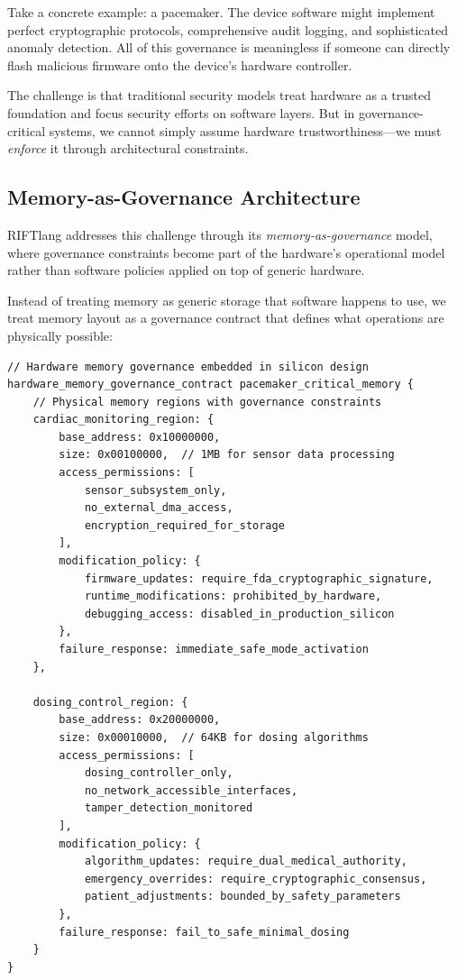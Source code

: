 Take a concrete example: a pacemaker. The device software might implement perfect cryptographic protocols, comprehensive audit logging, and sophisticated anomaly detection. All of this governance is meaningless if someone can directly flash malicious firmware onto the device's hardware controller.

The challenge is that traditional security models treat hardware as a trusted foundation and focus security efforts on software layers. But in governance-critical systems, we cannot simply assume hardware trustworthiness—we must \textit{enforce} it through architectural constraints.

\subsection{Memory-as-Governance Architecture}

RIFTlang addresses this challenge through its \textit{memory-as-governance} model, where governance constraints become part of the hardware's operational model rather than software policies applied on top of generic hardware.

Instead of treating memory as generic storage that software happens to use, we treat memory layout as a governance contract that defines what operations are physically possible:

\begin{lstlisting}[language=rift, caption=Hardware-Level Memory Governance]
// Hardware memory governance embedded in silicon design
hardware_memory_governance_contract pacemaker_critical_memory {
    // Physical memory regions with governance constraints
    cardiac_monitoring_region: {
        base_address: 0x10000000,
        size: 0x00100000,  // 1MB for sensor data processing
        access_permissions: [
            sensor_subsystem_only,
            no_external_dma_access,
            encryption_required_for_storage
        ],
        modification_policy: {
            firmware_updates: require_fda_cryptographic_signature,
            runtime_modifications: prohibited_by_hardware,
            debugging_access: disabled_in_production_silicon
        },
        failure_response: immediate_safe_mode_activation
    },
    
    dosing_control_region: {
        base_address: 0x20000000,
        size: 0x00010000,  // 64KB for dosing algorithms
        access_permissions: [
            dosing_controller_only,
            no_network_accessible_interfaces,
            tamper_detection_monitored
        ],
        modification_policy: {
            algorithm_updates: require_dual_medical_authority,
            emergency_overrides: require_cryptographic_consensus,
            patient_adjustments: bounded_by_safety_parameters
        },
        failure_response: fail_to_safe_minimal_dosing
    }
}
\end{lstlisting}

